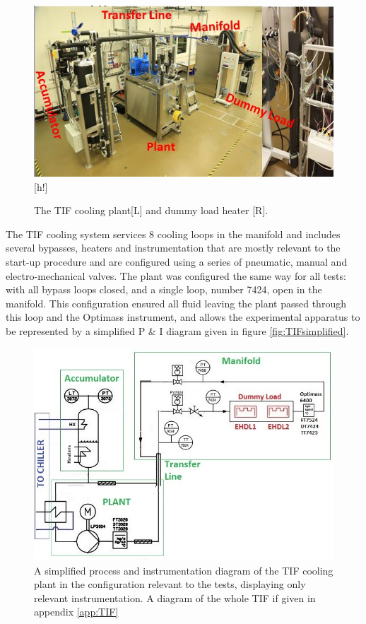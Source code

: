 \documentclass{report}
\begin{document}
\begin{figure}
\includegraphics[width=\textwidth]{TIFandHeater.jpg}[h!]
\caption{The TIF cooling plant[L] and dummy load heater [R]. \cite{tif web}}
\label{fig:TIF}
\end{figure}

The TIF cooling system services 8 cooling loops in the manifold and includes several bypasses, heaters and instrumentation that are mostly relevant to the  start-up procedure and are configured using a series of pneumatic, manual and electro-mechanical valves. 
The plant was configured the same way for all tests: with all bypass loops closed, and a single loop, number 7424, open in the manifold. This configuration ensured all fluid leaving the plant passed through this loop and the Optimass instrument, and allows the experimental apparatus to be represented by a simplified P \& I diagram given in figure \ref{fig:TIFsimplified}.
\begin{figure}
\includegraphics[width=\textwidth]{TIFsimplified.jpg}
\caption{A simplified process and instrumentation diagram of the TIF cooling plant in the configuration relevant to the tests, displaying only relevant instrumentation. A diagram of the whole TIF if given in appendix \ref{app:TIF}}
\label{fig:Tifsimplified}
\end{figure}
\end{document}
